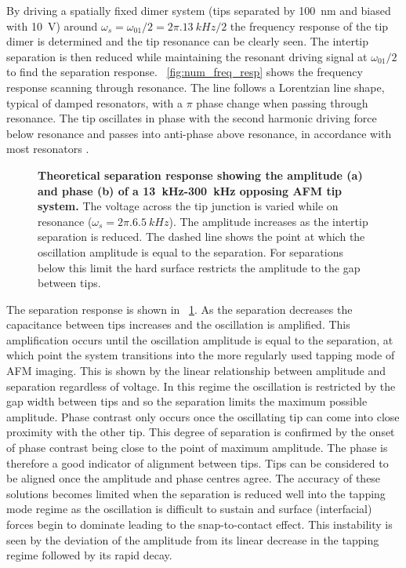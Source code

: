 \documentclass{article}
\begin{document}
By driving a spatially fixed dimer system (tips separated by \SI{100}{nm} and biased with \SI{10}{V}) around $\omega_s = \omega_{01}/2 = 2\pi.\SI{13}{kHz}/2$ the frequency response of the tip dimer is determined and the tip resonance can be clearly seen. The intertip separation is then reduced while maintaining the resonant driving signal at $\omega_{01}/2$ to find the separation response.
\figurename~\ref{fig:num_freq_resp} shows the frequency response scanning through resonance. The line follows a Lorentzian line shape, typical of damped resonators, with a $\pi$ phase change when passing through resonance. The tip oscillates in phase with the second harmonic driving force below resonance and passes into anti-phase above resonance, in accordance with most resonators \cite{}.

\begin{figure}[h]
\centering
{}
{\caption[Theoretical separation response showing the amplitude (a) and phase (b) of a \SI{13}{kHz}-\SI{300}{kHz} opposing AFM tip system]{\textbf{Theoretical separation response showing the amplitude (a) and phase (b) of a \SI{13}{kHz}-\SI{300}{kHz} opposing AFM tip system.} The voltage across the tip junction is varied while on resonance ($\omega_s = 2\pi.\SI{6.5}{kHz}$). The amplitude increases as the intertip separation is reduced. The dashed line shows the point at which the oscillation amplitude is equal to the separation. For separations below this limit the hard surface restricts the amplitude to the gap between tips.}
\label{fig:num_sep_resp}}
\end{figure}

The separation response is shown in \figurename~\ref{fig:num_sep_resp}. As the separation decreases the capacitance between tips increases and the oscillation is amplified. This amplification occurs until the oscillation amplitude is equal to the separation, at which point the system transitions into the more regularly used tapping mode of AFM imaging. This is shown by the linear relationship between amplitude and separation regardless of voltage. In this regime the oscillation is restricted by the gap width between tips and so the separation limits the maximum possible amplitude.
Phase contrast only occurs once the oscillating tip can come into close proximity with the other tip. This degree of separation is confirmed by the onset of phase contrast being close to the point of maximum amplitude. The phase is therefore a good indicator of alignment between tips. Tips can be considered to be aligned once the amplitude and phase centres agree. The accuracy of these solutions becomes limited when the separation is reduced well into the tapping mode regime as the oscillation is difficult to sustain and surface (interfacial) forces begin to dominate leading to the snap-to-contact effect. This instability is seen by the deviation of the amplitude from its linear decrease in the tapping regime followed by its rapid decay.
\end{document}
